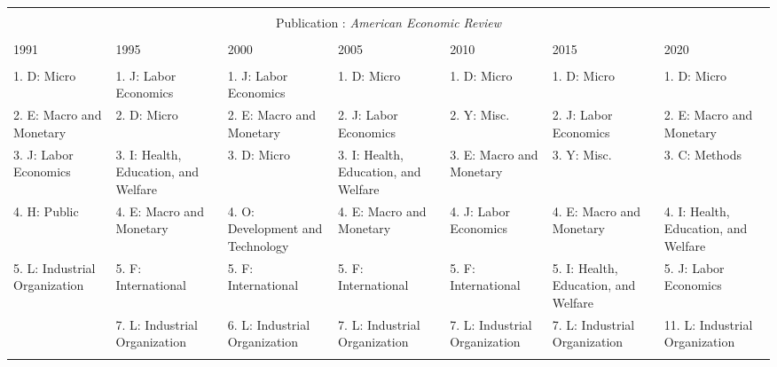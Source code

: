 
\begin{table}[h] \centering 
  \caption{} 
  \label{} 
\begin{adjustbox}{max width = \textwidth}
\scriptsize 
\begin{tabular}{@{\extracolsep{5pt}} lllllll} 
\\[-1.8ex]\hline 
\hline \\[-1.8ex] \multicolumn{7}{c}{Publication : \textit{American Economic Review}} \\
 \cline{1-7} \\
1991 & 1995 & 2000 & 2005 & 2010 & 2015 & 2020 \\ 
\hline \\[-1.8ex] 
1. D: Micro & 1. J: Labor Economics & 1. J: Labor Economics & 1. D: Micro & 1. D: Micro & 1. D: Micro & 1. D: Micro \\ 
2. E: Macro and Monetary & 2. D: Micro & 2. E: Macro and Monetary & 2. J: Labor Economics & 2. Y: Misc. & 2. J: Labor Economics & 2. E: Macro and Monetary \\ 
3. J: Labor Economics & 3. I: Health, Education, and Welfare & 3. D: Micro & 3. I: Health, Education, and Welfare & 3. E: Macro and Monetary & 3. Y: Misc. & 3. C: Methods \\ 
4. H: Public & 4. E: Macro and Monetary & 4. O: Development and Technology & 4. E: Macro and Monetary & 4. J: Labor Economics & 4. E: Macro and Monetary & 4. I: Health, Education, and Welfare \\ 
5. L: Industrial Organization & 5. F: International & 5. F: International & 5. F: International & 5. F: International & 5. I: Health, Education, and Welfare & 5. J: Labor Economics \\ 
 & 7. L: Industrial Organization & 6. L: Industrial Organization & 7. L: Industrial Organization & 7. L: Industrial Organization & 7. L: Industrial Organization & 11. L: Industrial Organization \\ 
\hline \\[-1.8ex] 
\end{tabular} 
\end{adjustbox} 
\end{table} 
